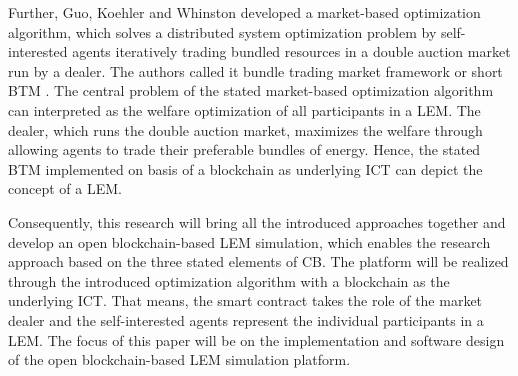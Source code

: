 Further, Guo, Koehler and Whinston developed a market-based optimization algorithm, which solves a distributed system optimization problem by self-interested agents iteratively trading bundled resources in a double auction market run by a dealer. The authors called it bundle trading market framework or short BTM . The central problem of the stated market-based optimization algorithm can interpreted as the welfare optimization of all participants in a LEM. The dealer, which runs the double auction market, maximizes the welfare through allowing agents to trade their preferable bundles of energy. Hence, the stated BTM implemented on basis of a blockchain as underlying ICT can depict the concept of a LEM.

Consequently, this research will bring all the introduced approaches together and develop an open blockchain-based LEM simulation, which enables the research approach based on the three stated elements of CB. The platform will be realized through the introduced optimization algorithm with a blockchain as the underlying ICT. That means, the smart contract takes the role of the market dealer and the self-interested agents represent the individual participants in a LEM. The focus of this paper will be on the implementation and software design of the open blockchain-based LEM simulation platform.

\clearpage